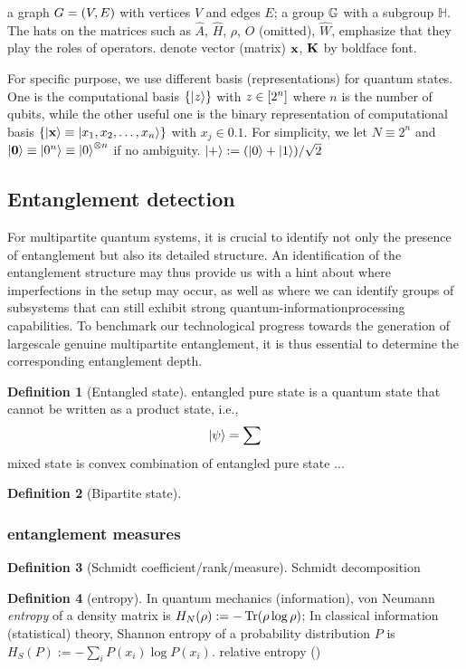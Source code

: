\documentclass[
10pt,
aps,
pra,
linenumbers,
floatfix,
]{revtex4-2}
\theoremstyle{plain}
\theoremstyle{definition}
\newtheorem{definition}{Definition}
\newcommand{\hamiltonian}{\hat{H}}
\newcommand{\ew}{\hat{W}}
\newcommand{\ob}{\hat{O}}
\newcommand{\subgroup}{\mathbb{H}}
\newcommand{\dm}{\rho}
\begin{document}
a graph $G=(V,E)$ with vertices $V$ and edges $E$; 
a group $\mathbb{G}$ with a subgroup $\subgroup$. 
The hats on the matrices such as $\hat{A}$, $\hamiltonian$, $\dm$, $\ob$ (omitted), $\ew$, emphasize that they play the roles of operators.
denote vector (matrix) $\vb{x}$, $\vb{K}$ by boldface font.

For specific purpose, we use different basis (representations) for quantum states.
One is the computational basis $\qty{\ket{z}}$ with $z\in \qty[2^n]$ where $n$ is the number of qubits,
while the other useful one is the binary representation of computational basis $\qty{\ket{\vb{x}}\equiv\ket{x_1,x_2,\dots,x_n}}$ with $x_j\in \qty{0,1}$. 
For simplicity, we let $N \equiv 2^n$ and $\ket{\vb{0}}\equiv\ket{0^n} \equiv\ket{0}^{\otimes n}$ if no ambiguity.
$\ket{+}: = (\ket{0}+\ket{1})/\sqrt{2} $

\subsection{Entanglement detection}
For multipartite quantum systems, it is crucial to identify not only the presence of entanglement but also its detailed structure.
An identification of the entanglement structure may thus provide us with a hint about where imperfections in the setup may occur, as well as where we can identify groups of subsystems that can still exhibit strong quantum-informationprocessing capabilities.
To benchmark our technological progress towards the generation of largescale genuine multipartite entanglement, it is thus essential to determine the corresponding entanglement depth.
\begin{definition}[Entangled state]\label{def:entangled_state}
	entangled pure state is a quantum state that cannot be written as a product state, i.e.,
	\begin{equation}
		\ket{\psi} = \sum
	\end{equation}
	mixed state is convex combination of entangled pure state ...
\end{definition}
\begin{definition}[Bipartite state]
\end{definition}

\subsubsection{entanglement measures}
\begin{definition}[Schmidt coefficient/rank/measure]
	Schmidt decomposition
\end{definition}
\begin{definition}[entropy]\label{def:entropy}
	In quantum mechanics (information), von Neumann \emph{entropy} of a density matrix is $H_N(\dm): = -\Tr(\dm \log \dm)$;
	In classical information (statistical) theory, Shannon entropy of a probability distribution $P$ is  $H_S(P):= -\sum_i P(x_i) \log P(x_i)$.
	relative entropy ()
\end{definition}
\end{document}
